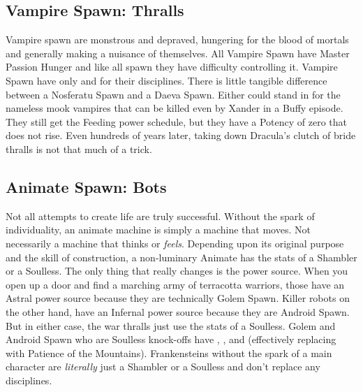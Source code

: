 \subsection{Vampire Spawn: Thralls} 

Vampire spawn are monstrous and depraved, hungering for the blood of mortals and generally making a nuisance of themselves. All Vampire Spawn have Master Passion Hunger and like all spawn they have difficulty controlling it. Vampire Spawn have only  and  for their disciplines. There is little tangible difference between a Nosferatu Spawn and a Daeva Spawn. Either could stand in for the nameless mook vampires that can be killed even by Xander in a Buffy episode. They still get the Feeding power schedule, but they have a Potency of zero that does not rise. Even hundreds of years later, taking down Dracula's clutch of bride thralls is not that much of a trick.

\subsection{Animate Spawn: Bots} 

Not all attempts to create life are truly successful. Without the spark of individuality, an animate machine is simply a machine that moves. Not necessarily a machine that thinks or \textit{feels}. Depending upon its original purpose and the skill of construction, a non-luminary Animate has the stats of a Shambler or a Soulless. The only thing that really changes is the power source. When you open up a door and find a marching army of terracotta warriors, those have an Astral power source because they are technically Golem Spawn. Killer robots on the other hand, have an Infernal power source because they are Android Spawn. But in either case, the war thralls just use the stats of a Soulless. Golem and Android Spawn who are Soulless knock-offs have , , and  (effectively replacing  with Patience of the Mountains). Frankensteins without the spark of a main character are \textit{literally} just a Shambler or a Soulless and don't replace any disciplines.

